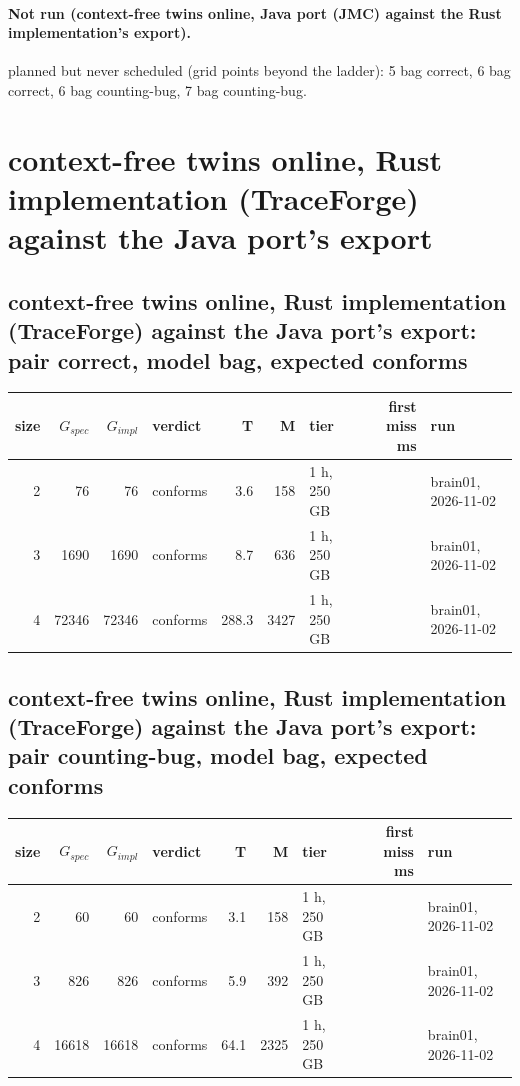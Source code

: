 \documentclass[10pt]{article}
\begin{document}
\paragraph{Not run (context-free twins online, Java port (JMC) against the Rust implementation's export).}
planned but never scheduled (grid points beyond the ladder): 5 bag correct, 6 bag correct, 6 bag counting-bug, 7 bag counting-bug.\par
\section*{context-free twins online, Rust implementation (TraceForge) against the Java port's export}
\subsection*{context-free twins online, Rust implementation (TraceForge) against the Java port's export: pair \textsf{correct}, model bag, expected conforms}
\begin{longtable}{@{}rrrlrrlrl@{}}
\toprule
size & $G_{\mathit{spec}}$ & $G_{\mathit{impl}}$ & verdict & T & M & tier & first miss ms & run \\
\midrule
\endhead
\color{red} 2 & 76 & 76 & conforms & 3.6 & 158 & 1 h, 250 GB &  & brain01, 2026-11-02 \\
\color{red} 3 & 1690 & 1690 & conforms & 8.7 & 636 & 1 h, 250 GB &  & brain01, 2026-11-02 \\
\color{red} 4 & 72346 & 72346 & conforms & 288.3 & 3427 & 1 h, 250 GB &  & brain01, 2026-11-02 \\
\bottomrule
\end{longtable}
\subsection*{context-free twins online, Rust implementation (TraceForge) against the Java port's export: pair \textsf{counting-bug}, model bag, expected conforms}
\begin{longtable}{@{}rrrlrrlrl@{}}
\toprule
size & $G_{\mathit{spec}}$ & $G_{\mathit{impl}}$ & verdict & T & M & tier & first miss ms & run \\
\midrule
\endhead
\color{red} 2 & 60 & 60 & conforms & 3.1 & 158 & 1 h, 250 GB &  & brain01, 2026-11-02 \\
\color{red} 3 & 826 & 826 & conforms & 5.9 & 392 & 1 h, 250 GB &  & brain01, 2026-11-02 \\
\color{red} 4 & 16618 & 16618 & conforms & 64.1 & 2325 & 1 h, 250 GB &  & brain01, 2026-11-02 \\
\bottomrule
\end{longtable}
\end{document}
